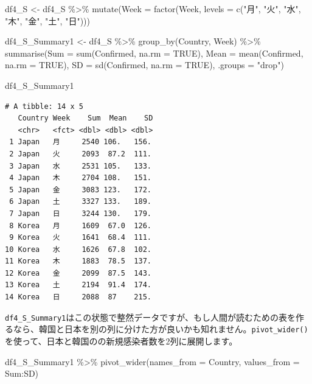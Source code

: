 \documentclass[
  a4paper,
  pandoc,
  ja=standard,
  jafont=haranoaji]{bxjsbook}
\newenvironment{Shaded}{\begin{snugshade}}{\end{snugshade}}
\newcommand{\AttributeTok}[1]{\textcolor[rgb]{0.00,0.48,0.65}{#1}}
\newcommand{\ConstantTok}[1]{\textcolor[rgb]{0.56,0.35,0.01}{#1}}
\newcommand{\FunctionTok}[1]{\textcolor[rgb]{0.28,0.35,0.67}{#1}}
\newcommand{\NormalTok}[1]{\textcolor[rgb]{0.00,0.48,0.65}{#1}}
\newcommand{\OtherTok}[1]{\textcolor[rgb]{0.00,0.48,0.65}{#1}}
\newcommand{\SpecialCharTok}[1]{\textcolor[rgb]{0.37,0.37,0.37}{#1}}
\newcommand{\StringTok}[1]{\textcolor[rgb]{0.13,0.47,0.30}{#1}}
\begin{document}
\begin{Shaded}
\begin{Highlighting}[numbers=left,,]
\NormalTok{df4\_S }\OtherTok{\textless{}{-}}\NormalTok{ df4\_S }\SpecialCharTok{\%\textgreater{}\%}
  \FunctionTok{mutate}\NormalTok{(}\AttributeTok{Week =} \FunctionTok{factor}\NormalTok{(Week, }
                       \AttributeTok{levels =} \FunctionTok{c}\NormalTok{(}\StringTok{"月"}\NormalTok{, }\StringTok{"火"}\NormalTok{, }\StringTok{"水"}\NormalTok{, }\StringTok{"木"}\NormalTok{, }\StringTok{"金"}\NormalTok{, }\StringTok{"土"}\NormalTok{, }\StringTok{"日"}\NormalTok{)))}

\NormalTok{df4\_S\_Summary1 }\OtherTok{\textless{}{-}}\NormalTok{ df4\_S }\SpecialCharTok{\%\textgreater{}\%}
  \FunctionTok{group\_by}\NormalTok{(Country, Week) }\SpecialCharTok{\%\textgreater{}\%}
  \FunctionTok{summarise}\NormalTok{(}\AttributeTok{Sum     =} \FunctionTok{sum}\NormalTok{(Confirmed,  }\AttributeTok{na.rm =} \ConstantTok{TRUE}\NormalTok{),}
            \AttributeTok{Mean    =} \FunctionTok{mean}\NormalTok{(Confirmed, }\AttributeTok{na.rm =} \ConstantTok{TRUE}\NormalTok{),}
            \AttributeTok{SD      =} \FunctionTok{sd}\NormalTok{(Confirmed,   }\AttributeTok{na.rm =} \ConstantTok{TRUE}\NormalTok{),}
            \AttributeTok{.groups =} \StringTok{"drop"}\NormalTok{)}

\NormalTok{df4\_S\_Summary1}
\end{Highlighting}
\end{Shaded}

\begin{verbatim}
# A tibble: 14 x 5
   Country Week    Sum  Mean    SD
   <chr>   <fct> <dbl> <dbl> <dbl>
 1 Japan   月     2540 106.   156.
 2 Japan   火     2093  87.2  111.
 3 Japan   水     2531 105.   133.
 4 Japan   木     2704 108.   151.
 5 Japan   金     3083 123.   172.
 6 Japan   土     3327 133.   189.
 7 Japan   日     3244 130.   179.
 8 Korea   月     1609  67.0  126.
 9 Korea   火     1641  68.4  111.
10 Korea   水     1626  67.8  102.
11 Korea   木     1883  78.5  137.
12 Korea   金     2099  87.5  143.
13 Korea   土     2194  91.4  174.
14 Korea   日     2088  87    215.
\end{verbatim}

\texttt{df4\_S\_Summary1}はこの状態で整然データですが、もし人間が読むための表を作るなら、韓国と日本を別の列に分けた方が良いかも知れません。\texttt{pivot\_wider()}を使って、日本と韓国のの新規感染者数を2列に展開します。

\begin{Shaded}
\begin{Highlighting}[numbers=left,,]
\NormalTok{df4\_S\_Summary1 }\SpecialCharTok{\%\textgreater{}\%}
  \FunctionTok{pivot\_wider}\NormalTok{(}\AttributeTok{names\_from  =}\NormalTok{ Country,}
              \AttributeTok{values\_from =}\NormalTok{ Sum}\SpecialCharTok{:}\NormalTok{SD)}
\end{Highlighting}
\end{Shaded}
\end{document}
